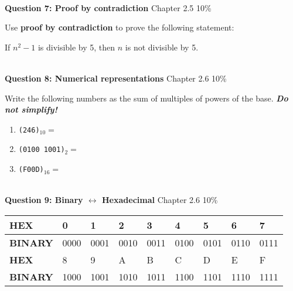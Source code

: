 \documentclass[a4paper,12pt]{book}
\begin{document}
\hrulefill

~\\
\textbf{Question 7: Proof by contradiction}
\hfill
Chapter 2.5
\hfill
10\%

Use \textbf{proof by contradiction} to prove the following statement:

If $ n^{2} - 1 $ is divisible by 5, then $ n $ is not divisible by 5.

\hrulefill

~\\
\textbf{Question 8: Numerical representations}
\hfill
Chapter 2.6
\hfill
10\%

Write the following numbers as the sum of multiples of powers of the base.
\textit{\textbf{Do not simplify!}}

\begin{enumerate}
	\item	\texttt{(246)}$_{10} = $		%
	\item	\texttt{(0100 1001)}$_{2} = $	%
	\item	\texttt{(F00D)}$_{16} = $		%
\end{enumerate}

\hrulefill

~\\
\textbf{Question 9: Binary $ \leftrightarrow $ Hexadecimal}
\hfill
Chapter 2.6
\hfill
10\%

\begin{center}
	\begin{tabular}{ | l | l | l | l | l | l | l | l | l |  }
	
	\hline 		\textbf{HEX} & 0 & 1 & 2 & 3 & 4 & 5 & 6 & 7  	\\ 
	\hline 		\textbf{BINARY} & 0000 & 0001 & 0010 & 0011 & 0100 & 0101 & 0110 & 0111  	\\ \hline
				\textbf{HEX} & 8 & 9 & A & B & C & D & E & F 	\\ 
	\hline 		\textbf{BINARY} & 1000 & 1001 & 1010 & 1011 & 1100 & 1101 & 1110 & 1111 	\\ \hline
		
	\end{tabular}
\end{center}
\end{document}
